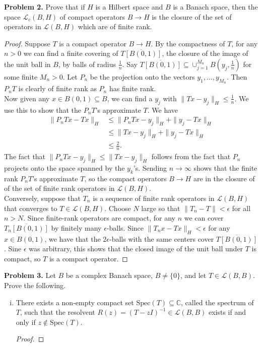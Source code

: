 \documentclass[11pt,letterpaper]{report}
\newcommand{\complex}{\mathbb{C}}
\newcommand{\mcal}[1]{\mathcal{#1}}
\newcommand{\spec}{\text{Spec}}
\begin{document}
\noindent\textbf{Problem 2. }
Prove that if $H$ is a Hilbert space and $B$ is a Banach space, then the space $\mcal{L}_c(B, H)$ of compact operators $B\to H$ is the closure of the set of operators in $\mcal{L}(B, H)$ which are of finite rank.
\begin{proof}
Suppose $T$ is a compact operator $B\to H$. By the compactness of $T$, for any $n>0$ we can find a finite covering of $\overline{T[B(0,1)]}$, the closure of the image of the unit ball in $B$, by balls of radius $\frac{1}{n}$. Say $\overline{T[B(0,1)]}\subseteq \cup_{j=1}^{M_n}B(y_j, \frac{1}{n})$ for some finite $M_n>0$. Let $P_n$ be the projection onto the vectors $y_1, \ldots, y_{M_n}$. Then $P_nT$ is clearly of finite rank as $P_n$ has finite rank.\\

\noindent Now given any $x\in B(0,1)\subseteq B$, we can find a $y_j$ with $\|Tx-y_j\|_H \leq \frac{1}{n}$. We use this to show that the $P_nT$'s approximate $T$. We have
\begin{align*}
	\|P_nTx - Tx\|_H &\leq \|P_nTx - y_j\|_H + \|y_j - Tx\|_H\\
	&\leq \|Tx-y_j\|_H + \|y_j-Tx\|_H\\
	&\leq \frac{2}{n}.
\end{align*}
The fact that $\|P_nTx-y_j\|_H \leq \|Tx-y_j\|_H$ follows from the fact that $P_n$ projects onto the space spanned by the $y_k$'s. Sending $n\to \infty$ shows that the finite rank $P_nT$'s approximate $T$, so the compact operators $B\to H$ are in the closure of of the set of finite rank operators in $\mcal{L}(B, H)$.\\

\noindent Conversely, suppose that $T_n$ is a sequence of finite rank operators in $\mcal{L}(B, H)$ that converges to $T\in \mcal{L}(B, H)$. Choose $N$ large so that $\|T_n - T\|<\epsilon$ for all $n>N$. Since finite-rank operators are compact, for any $n$ we can cover $\overline{T_n[B(0,1)]}$ by finitely many $\epsilon$-balls. Since $\|T_nx-Tx\|_H<\epsilon$ for any $x\in B(0,1)$, we have that the $2\epsilon$-balls with the same centers cover $\overline{T[B(0,1)]}$. Sine $\epsilon$ was arbitrary, this shows that the closed image of the unit ball under $T$ is compact, so $T$ is a compact operator.
\end{proof}

\noindent\textbf{Problem 3. }Let $B$ be a complex Banach space, $B\neq \{0\}$, and let $T\in \mcal{L}(B, B)$. Prove the following.
\begin{enumerate}[(i)]
	\item There exists a non-empty compact set $\spec(T)\subseteq \complex$, called the spectrum of $T$, such that the resolvent $R(z) = (T-zI)^{-1}\in \mcal{L}(B, B)$ exists if and only if $z\notin \spec(T)$.
	\begin{proof}
		
	\end{proof}
\end{enumerate}
\end{document}
